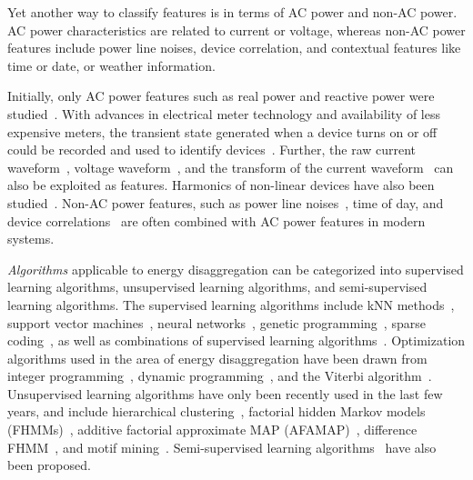 Yet another way to classify features is in terms of
AC power and non-AC power.
AC power characteristics are related to
current or voltage,
whereas non-AC power features include
power line noises, device correlation, and
contextual features like time or date, or weather information.

Initially, only
AC power features such as real power
and reactive power were studied~\cite{hart1992}.
With advances in electrical meter technology and availability of less expensive meters,
the transient state generated when a device turns on or off could be recorded and used
to identify devices~\cite{shaw2000PhdThesis}. 
Further, the raw current waveform~\cite{srinivasan2006neural}, voltage waveform~\cite{lam2007novel}, 
and the transform of the current waveform~\cite{chan2000harmonics}
can also be exploited as features.
Harmonics of non-linear devices
have also been studied~\cite{chan2000harmonics}.
Non-AC power features, such as power line noises~\cite{patel2007flick},
time of day, and device correlations~\cite{kim2011unsupervised}
are often combined with AC power features in modern systems. 

{\it Algorithms} applicable to energy disaggregation
can be categorized into supervised learning algorithms, 
unsupervised learning algorithms, and semi-supervised learning algorithms. 
The supervised learning algorithms include
kNN methods~\cite{shaw2000PhdThesis},
support vector machines~\cite{patel2007flick},
neural networks~\cite{roos1994using},
genetic programming~\cite{baranski2004genetic},
sparse coding~\cite{kolter2010sparse}, 
as well as
combinations of supervised learning algorithms~\cite{nakano2007non}. 
Optimization algorithms used in the area of energy disaggregation have
been drawn from integer programming~\cite{suzuki2008nonintrusive}, 
dynamic programming~\cite{baranski2004detecting}, and
the Viterbi algorithm~\cite {zeifman2011viterbi}.
Unsupervised learning algorithms
have only been recently used in
 the last few years, and include
hierarchical clustering~\cite{gonccalves2011unsupervised},
factorial hidden Markov models (FHMMs)~\cite{kim2011unsupervised},
additive factorial approximate MAP (AFAMAP)~\cite{kolter2012aistat}, 
difference FHMM~\cite{parson2012nonintrusive}, 
and motif mining~\cite{shao2013temporal}.
Semi-supervised learning 
algorithms~\cite{lam2007novel,johnson2012bayesian} have also
been proposed.


